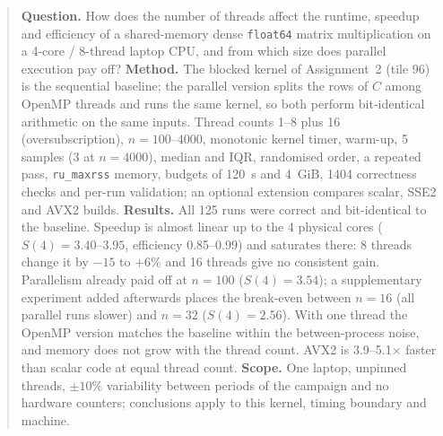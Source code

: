\begin{abstract}
\noindent\textbf{Question.} How does the number of threads affect the runtime, speedup and efficiency of a shared-memory dense \texttt{float64}
matrix multiplication on a 4-core / 8-thread laptop CPU, and from which size does parallel execution pay off?
\textbf{Method.} The blocked kernel of Assignment~2 (tile 96) is the sequential baseline; the parallel version splits the rows of $C$ among
OpenMP threads and runs the same kernel, so both perform bit-identical arithmetic on the same inputs. Thread counts 1--8 plus 16 (oversubscription),
$n=100$--$4000$, monotonic kernel timer, warm-up, 5 samples (3 at $n=4000$), median and IQR, randomised order, a repeated pass, \texttt{ru\_maxrss}
memory, budgets of 120~s and 4~GiB, 1404 correctness checks and per-run validation; an optional extension compares scalar, SSE2 and AVX2 builds.
\textbf{Results.} All 125 runs were correct and bit-identical to the baseline. Speedup is almost linear up to the 4 physical cores
($S(4)=3.40$--$3.95$, efficiency 0.85--0.99) and saturates there: 8 threads change it by $-15$ to $+6\%$ and 16 threads give no consistent gain.
Parallelism already paid off at $n=100$ ($S(4)=3.54$); a supplementary experiment added afterwards places the break-even between
$n=16$ (all parallel runs slower) and $n=32$ ($S(4)=2.56$). With one thread the OpenMP version matches the baseline within the between-process noise, and
memory does not grow with the thread count. AVX2 is 3.9--5.1$\times$ faster than scalar code at equal thread count.
\textbf{Scope.} One laptop, unpinned threads, $\pm10\%$ variability between periods of the campaign and no hardware counters; conclusions apply to
this kernel, timing boundary and machine.
\end{abstract}
